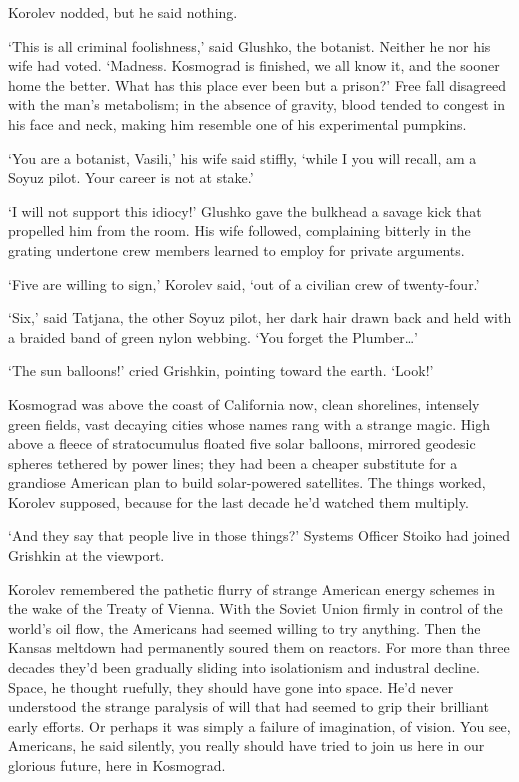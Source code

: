 Korolev nodded, but he said nothing.

‘This is all criminal foolishness,’ said Glushko, the botanist. Neither he nor his wife had voted. ‘Madness. Kosmograd is finished, we all know it, and the sooner home the better. What has this place ever been but a prison?’ Free fall disagreed with the man’s metabolism; in the absence of gravity, blood tended to congest in his face and neck, making him resemble one of his experimental pumpkins.

‘You are a botanist, Vasili,’ his wife said stiffly, ‘while I you will recall, am a Soyuz pilot. Your career is not at stake.’

‘I will not support this idiocy!’ Glushko gave the bulkhead a savage kick that propelled him from the room. His wife followed, complaining bitterly in the grating undertone crew members learned to employ for private arguments.

‘Five are willing to sign,’ Korolev said, ‘out of a civilian crew of twenty-four.’

‘Six,’ said Tatjana, the other Soyuz pilot, her dark hair drawn back and held with a braided band of green nylon webbing. ‘You forget the Plumber…’

‘The sun balloons!’ cried Grishkin, pointing toward the earth. ‘Look!’

Kosmograd was above the coast of California now, clean shorelines, intensely green fields, vast decaying cities whose names rang with a strange magic. High above a fleece of stratocumulus floated five solar balloons, mirrored geodesic spheres tethered by power lines; they had been a cheaper substitute for a grandiose American plan to build solar-powered satellites. The things worked, Korolev supposed, because for the last decade he’d watched them multiply.

‘And they say that people live in those things?’ Systems Officer Stoiko had joined Grishkin at the viewport.

Korolev remembered the pathetic flurry of strange American energy schemes in the wake of the Treaty of Vienna. With the Soviet Union firmly in control of the world’s oil flow, the Americans had seemed willing to try anything. Then the Kansas meltdown had permanently soured them on reactors. For more than three decades they’d been gradually sliding into isolationism and industral decline. Space, he thought ruefully, they should have gone into space. He’d never understood the strange paralysis of will that had seemed to grip their brilliant early efforts. Or perhaps it was simply a failure of imagination, of vision. You see, Americans, he said silently, you really should have tried to join us here in our glorious future, here in Kosmograd.

